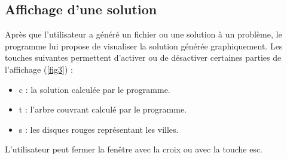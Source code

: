 \documentclass[a4paper,11pt]{article}
\begin{document}
\subsection{Affichage d'une solution}
Après que l'utilisateur a généré un fichier ou une solution à un problème, le programme lui propose de visualiser la solution générée graphiquement.
Les touches suivantes permettent d'activer ou de désactiver certaines parties de l'affichage (\ref{fig3}) :
\begin{itemize}
\item c : la solution calculée par le programme.
\item t : l'arbre couvrant calculé par le programme.
\item s : les disques rouges représentant les villes.
\end{itemize}
L'utilisateur peut fermer la fenêtre avec la croix ou avec la touche esc.
\end{document}
